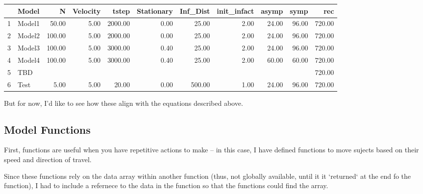 \documentclass{article}\usepackage[]{graphicx}\usepackage[]{color}
\begin{document}
\begin{table}[ht]
\centering
\begin{tabular}{rlrrrrrrrrr}
  \hline
 & Model & N & Velocity & tstep & Stationary & Inf\_Dist & init\_infact & asymp & symp & rec \\ 
  \hline
1 & Model1 & 50.00 & 5.00 & 2000.00 & 0.00 & 25.00 & 2.00 & 24.00 & 96.00 & 720.00 \\ 
  2 & Model2 & 100.00 & 5.00 & 2000.00 & 0.00 & 25.00 & 2.00 & 24.00 & 96.00 & 720.00 \\ 
  3 & Model3 & 100.00 & 5.00 & 3000.00 & 0.40 & 25.00 & 2.00 & 24.00 & 96.00 & 720.00 \\ 
  4 & Model4 & 100.00 & 5.00 & 3000.00 & 0.40 & 25.00 & 2.00 & 60.00 & 60.00 & 720.00 \\ 
  5 & TBD &  &  &  &  &  &  &  &  & 720.00 \\ 
  6 & Test & 5.00 & 5.00 & 20.00 & 0.00 & 500.00 & 1.00 & 24.00 & 96.00 & 720.00 \\ 
   \hline
\end{tabular}
\end{table}


But for now, I'd like to see how these align with the equations described above.

\subsection{Model Functions}

First, functions are useful when you have repetitive actions to make -- in this case, I have defined functions to move sujects based on their speed and direction of travel. 

Since these functions rely on the data array within another function (thus, not globally available, until it it `returned` at the end fo the function), I had to include a refernece to the data in the function so that the functions could find the array.
\end{document}
